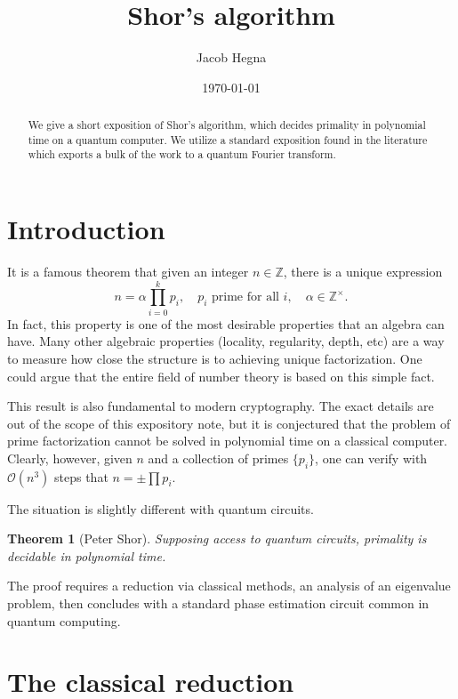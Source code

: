 \documentclass{amsart}
\title{Shor's algorithm}
\author{Jacob Hegna}
\date{\today}
\newcommand{\Zz}{\mathbb{Z}}
\newtheorem{theorem}{Theorem}[section]
\theoremstyle{definition}
\theoremstyle{remark}
\begin{document}
\maketitle

\begin{abstract}
    We give a short exposition of Shor's algorithm, which decides primality in
    polynomial time on a quantum computer. We utilize a standard exposition
    found in the literature which exports a bulk of the work to a quantum
    Fourier transform.
\end{abstract}

\tableofcontents

\section{Introduction}

It is a famous theorem that given an integer $n \in \Zz$, there is a unique
expression
\[
    n = \alpha \prod_{i = 0}^k p_i,
    \quad p_i \text{ prime for all } i,
    \quad \alpha \in \Zz^\times.
\]
In fact, this property is one of the most desirable properties that an algebra
can have. Many other algebraic properties (locality, regularity, depth, etc) are
a way to measure how close the structure is to achieving unique factorization.
One could argue that the entire field of number theory is based on this simple
fact.

This result is also fundamental to modern cryptography. The exact details are
out of the scope of this expository note, but it is conjectured that the problem
of prime factorization cannot be solved in polynomial time on a classical
computer. Clearly, however, given $n$ and a collection of primes $\{p_i\}$, one
can verify with $\mathcal{O}(n^3)$ steps that $n = \pm \prod p_i$.

The situation is slightly different with quantum circuits.

\begin{theorem}[Peter Shor]
    Supposing access to quantum circuits, primality is decidable in polynomial
    time.
\end{theorem}

The proof requires a reduction via classical methods, an analysis of an
eigenvalue problem, then concludes with a standard phase estimation circuit
common in quantum computing.

\section{The classical reduction}
\end{document}
